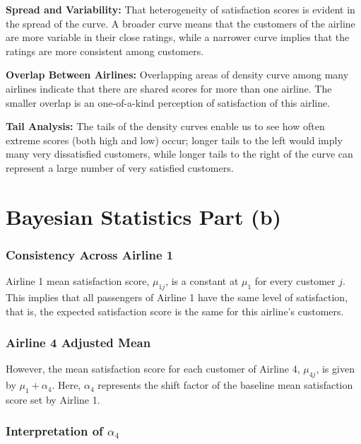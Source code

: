 \documentclass[
]{article}
\begin{document}
\textbf{Spread and Variability:} That heterogeneity of satisfaction
scores is evident in the spread of the curve. A broader curve means that
the customers of the airline are more variable in their close ratings,
while a narrower curve implies that the ratings are more consistent
among customers.

\textbf{Overlap Between Airlines:} Overlapping areas of density curve
among many airlines indicate that there are shared scores for more than
one airline. The smaller overlap is an one-of-a-kind perception of
satisfaction of this airline.

\textbf{Tail Analysis:} The tails of the density curves enable us to see
how often extreme scores (both high and low) occur; longer tails to the
left would imply many very dissatisfied customers, while longer tails to
the right of the curve can represent a large number of very satisfied
customers.

\section{Bayesian Statistics Part (b)}\label{bayesian-statistics-part-b}

\subsubsection{Consistency Across Airline
1}\label{consistency-across-airline-1}

Airline 1 mean satisfaction score, \(\mu_{1j}\), is a constant at
\(\mu_1\) for every customer \(j\). This implies that all passengers of
Airline 1 have the same level of satisfaction, that is, the expected
satisfaction score is the same for this airline's customers.

\subsubsection{Airline 4 Adjusted Mean}\label{airline-4-adjusted-mean}

However, the mean satisfaction score for each customer of Airline 4,
\(\mu_{4j}\), is given by \(\mu_1 + \alpha_4\). Here, \(\alpha_4\)
represents the shift factor of the baseline mean satisfaction score set
by Airline 1.

\subsubsection{\texorpdfstring{Interpretation of
\(\alpha_4\)}{Interpretation of \textbackslash alpha\_4}}\label{interpretation-of-alpha_4}
\end{document}
